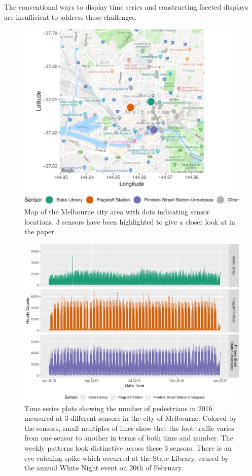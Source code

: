 \documentclass[12pt]{article}
\begin{document}
The conventional ways to display time series and constructing faceted
displays are insufficient to address these challenges.

\begin{figure}

{\centering \includegraphics[width=0.7\linewidth]{figure/ped-map-1} 

}

\caption{Map of the Melbourne city area with dots indicating sensor locations. 3 sensors have been highlighted to give a closer look at in the paper.}\label{fig:ped-map}
\end{figure}

\begin{figure}

{\centering \includegraphics[width=\textwidth]{figure/time-series-plot-1} 

}

\caption{Time series plots showing the number of pedestrians in 2016 measured at 3 different sensors in the city of Melbourne. Colored by the sensors, small multiples of lines show that the foot traffic varies from one sensor to another in terms of both time and number. The weekly patterns look distinctive across these 3 sensors. There is an eye-catching spike which occurred at the State Library, caused by the annual White Night event on 20th of February.}\label{fig:time-series-plot}
\end{figure}
\end{document}
